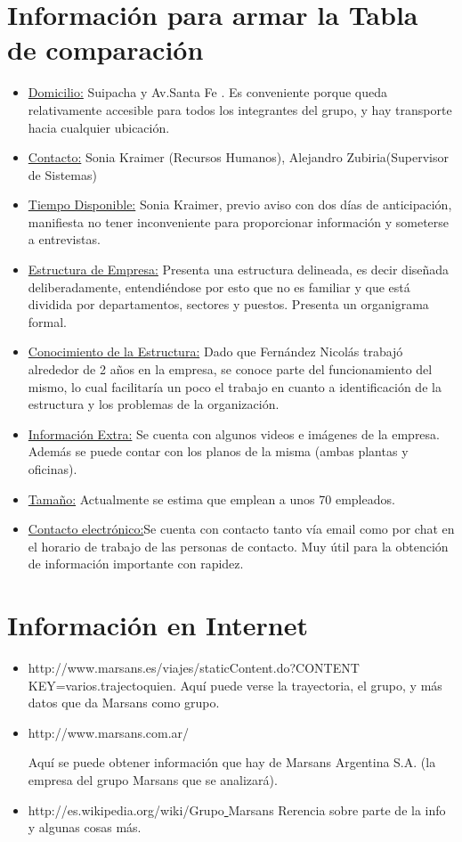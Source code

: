 \documentclass[12pt,a4paper,spanish]{article}
\begin{document}
\begin{flushleft}
\section{Informaci\'{o}n para armar la Tabla de comparaci\'{o}n}
\begin{itemize}
\item \underline{Domicilio:} Suipacha y Av.Santa Fe . Es conveniente porque queda relativamente accesible para todos los integrantes del grupo, y hay transporte hacia cualquier ubicaci\'on.
\item \underline{Contacto:} Sonia Kraimer (Recursos Humanos), Alejandro Zubiria(Supervisor de Sistemas)
\item \underline{Tiempo Disponible:} Sonia Kraimer, previo aviso con dos d\'ias de anticipaci\'on, manifiesta no tener inconveniente para proporcionar informaci\'on y someterse a entrevistas.
\item \underline{Estructura de Empresa:} Presenta una estructura delineada, es decir dise\~nada deliberadamente, entendi\'endose por esto que no es familiar y que est\'a dividida por departamentos, sectores y puestos. Presenta un organigrama formal.
\item \underline{Conocimiento de la Estructura:} Dado que Fern\'{a}ndez Nicol\'{a}s trabaj\'o alrededor de 2 a\~{n}os en la empresa, se conoce parte del funcionamiento del mismo, lo cual facilitar\'ia un poco el trabajo en cuanto a identificaci\'on de la estructura y los problemas de la organizaci\'on.
\item \underline{Informaci\'{o}n Extra:} Se cuenta con algunos videos e im\'{a}genes de la empresa. Adem\'{a}s se puede contar con los planos de la misma (ambas plantas y oficinas).
\item \underline{Tama\~{n}o:} Actualmente se estima que emplean a unos 70 empleados.
\item \underline{Contacto electr\'{o}nico:}Se cuenta con contacto tanto v\'{i}a email como por chat en el horario de trabajo de las personas de contacto. Muy \'util para la obtenci\'on de informaci\'on importante con rapidez.

\end{itemize}
\newpage
\section{Informaci\'{o}n en Internet} 
\begin{itemize}
\item http://www.marsans.es/viajes/staticContent.do?CONTENT\underline{ }KEY=varios.trajectoquien.\linebreak
Aqu\'i puede verse la trayectoria, el grupo, y m\'as datos que da Marsans como grupo.
\item http://www.marsans.com.ar/ \linebreak

Aqu\'{i} se puede obtener informaci\'on que hay de Marsans Argentina S.A. (la empresa del grupo Marsans que se analizar\'a).
\item http://es.wikipedia.org/wiki/Grupo\underline{ }Marsans \linebreak
Rerencia sobre parte de la info y algunas cosas m\'{a}s.
\end{itemize}
\end{flushleft}
\end{document}
